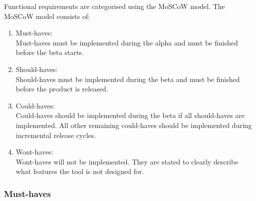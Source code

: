 Functional requirements are categorised using the MoSCoW model.
The MoSCoW model consists of:
\begin{enumerate}
  \item Must-haves:\\
    Must-haves must be implemented during the alpha and must be finished
    before the beta starts.
  \item Should-haves:\\
    Should-haves must be implemented during the beta and must be finished
    before the product is released.
  \item Could-haves:\\
    Could-haves should be implemented during the beta if all should-haves are
    implemented. All other remaining could-haves should be implemented during
    incremental release cycles.
  \item Wont-haves:\\
    Wont-haves will not be implemented. They are stated to clearly describe
    what features the tool is not designed for.
\end{enumerate}

\subsubsection{Must-haves}


